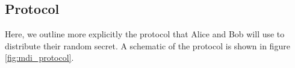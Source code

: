 


\subsection{Protocol}

Here, we outline more explicitly the protocol that Alice and Bob will use to distribute their random secret. A schematic of the protocol is shown in figure \ref{fig:mdi_protocol}. 


